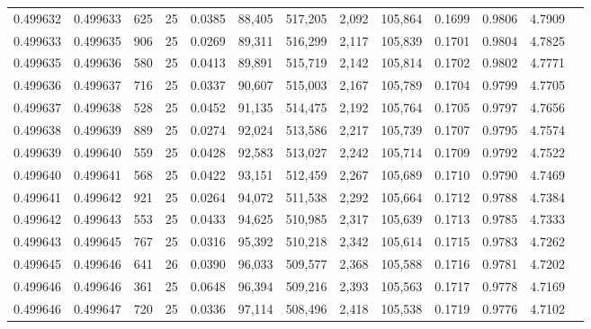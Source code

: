 \begin{tabular}{rrrrrrrrrrrrr}
0.499632 & 0.499633 &   625 &  25 &                                     0.0385 &  88,405 & 517,205 &   2,092 & 105,864 & 0.1699 & 0.9806 & 4.7909 \\
0.499633 & 0.499635 &   906 &  25 &                                     0.0269 &  89,311 & 516,299 &   2,117 & 105,839 & 0.1701 & 0.9804 & 4.7825 \\
0.499635 & 0.499636 &   580 &  25 &                                     0.0413 &  89,891 & 515,719 &   2,142 & 105,814 & 0.1702 & 0.9802 & 4.7771 \\
0.499636 & 0.499637 &   716 &  25 &                                     0.0337 &  90,607 & 515,003 &   2,167 & 105,789 & 0.1704 & 0.9799 & 4.7705 \\
0.499637 & 0.499638 &   528 &  25 &                                     0.0452 &  91,135 & 514,475 &   2,192 & 105,764 & 0.1705 & 0.9797 & 4.7656 \\
0.499638 & 0.499639 &   889 &  25 &                                     0.0274 &  92,024 & 513,586 &   2,217 & 105,739 & 0.1707 & 0.9795 & 4.7574 \\
0.499639 & 0.499640 &   559 &  25 &                                     0.0428 &  92,583 & 513,027 &   2,242 & 105,714 & 0.1709 & 0.9792 & 4.7522 \\
0.499640 & 0.499641 &   568 &  25 &                                     0.0422 &  93,151 & 512,459 &   2,267 & 105,689 & 0.1710 & 0.9790 & 4.7469 \\
0.499641 & 0.499642 &   921 &  25 &                                     0.0264 &  94,072 & 511,538 &   2,292 & 105,664 & 0.1712 & 0.9788 & 4.7384 \\
0.499642 & 0.499643 &   553 &  25 &                                     0.0433 &  94,625 & 510,985 &   2,317 & 105,639 & 0.1713 & 0.9785 & 4.7333 \\
0.499643 & 0.499645 &   767 &  25 &                                     0.0316 &  95,392 & 510,218 &   2,342 & 105,614 & 0.1715 & 0.9783 & 4.7262 \\
0.499645 & 0.499646 &   641 &  26 &                                     0.0390 &  96,033 & 509,577 &   2,368 & 105,588 & 0.1716 & 0.9781 & 4.7202 \\
0.499646 & 0.499646 &   361 &  25 &                                     0.0648 &  96,394 & 509,216 &   2,393 & 105,563 & 0.1717 & 0.9778 & 4.7169 \\
0.499646 & 0.499647 &   720 &  25 &                                     0.0336 &  97,114 & 508,496 &   2,418 & 105,538 & 0.1719 & 0.9776 & 4.7102 \\

\end{tabular}
